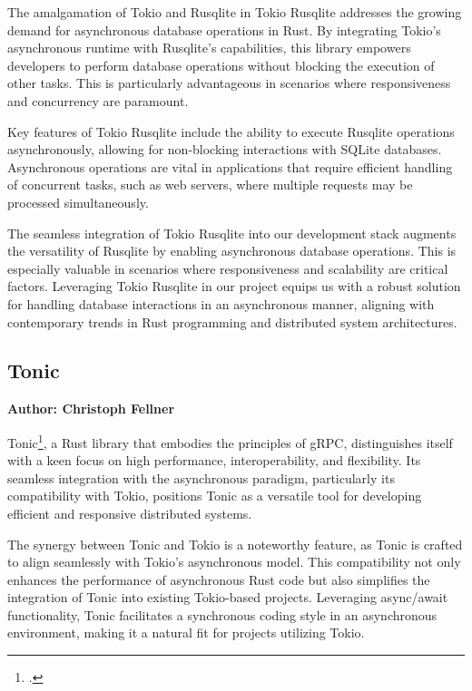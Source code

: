 The amalgamation of Tokio and Rusqlite in Tokio Rusqlite addresses the growing demand for asynchronous database operations in Rust. By integrating Tokio's 
asynchronous runtime with Rusqlite's capabilities, this library empowers developers to perform database operations without blocking the execution of other tasks.
This is particularly advantageous in scenarios where responsiveness and concurrency are paramount.\newline

Key features of Tokio Rusqlite include the ability to execute Rusqlite operations asynchronously, allowing for non-blocking interactions with SQLite databases. 
Asynchronous operations are vital in applications that require efficient handling of concurrent tasks, such as web servers, where multiple requests may be 
processed simultaneously.\newline

The seamless integration of Tokio Rusqlite into our development stack augments the versatility of Rusqlite by enabling asynchronous database operations. This is 
especially valuable in scenarios where responsiveness and scalability are critical factors. Leveraging Tokio Rusqlite in our project equips us with a robust 
solution for handling database interactions in an asynchronous manner, aligning with contemporary trends in Rust programming and distributed system 
architectures.

\subsection{Tonic}
\textbf{Author: Christoph Fellner}

Tonic\footcite{tonic}, a Rust library that embodies the principles of gRPC, distinguishes itself with a keen focus on high performance, interoperability, and 
flexibility. Its seamless integration with the asynchronous paradigm, particularly its compatibility with Tokio, positions Tonic as a versatile tool for 
developing efficient and responsive distributed systems.\newline

The synergy between Tonic and Tokio is a noteworthy feature, as Tonic is crafted to align seamlessly with Tokio's asynchronous model. This compatibility not 
only enhances the performance of asynchronous Rust code but also simplifies the integration of Tonic into existing Tokio-based projects. Leveraging async/await 
functionality, Tonic facilitates a synchronous coding style in an asynchronous environment, making it a natural fit for projects utilizing Tokio.\newline

